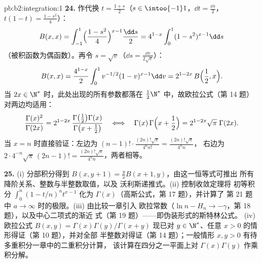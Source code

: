 \begin{solution}{pb:b2:integration:1}
\textbf{24.} 作代换 $t = \frac{1+s}2$（$s \in
\intoo{-1}1$，$\dd t = \frac{\dd s}2$，$t(1-t) =
\frac{1-s^2}4$）：
\[
B(x,x) = \int_{-1}^{1}\Bigl(\frac{1-s^2}{4}\Bigr)^{x-1}
\frac{\dd s}{2}
= 4^{1-x}\int_0^1 (1-s^2)^{x-1}\dd s
\]
（被积函数为偶函数）。再令 $s = \sqrt v$（$\dd s =
\frac{\dd v}{2\sqrt v}$）：
\[
B(x,x) = \frac{4^{1-x}}{2}\int_0^1
v^{-1/2}(1-v)^{x-1}\dd v
= 2^{1-2x}\,B\Bigl(\frac12, x\Bigr) .
\]
当 $2x \in \N^*$ 时，此处出现的所有参数都落在
$\frac12\N^*$ 中，故欧拉公式（第 14 题）
对两边均适用：
\[
\frac{\Gamma(x)^2}{\Gamma(2x)}
= 2^{1-2x}\,
\frac{\Gamma\bigl(\frac12\bigr)\Gamma(x)}
{\Gamma\bigl(x+\frac12\bigr)}
\quad\Longleftrightarrow\quad
\Gamma(x)\,\Gamma\Bigl(x+\frac12\Bigr)
= 2^{1-2x}\sqrt\pi\;\Gamma(2x) .
\]
当 $x = n$ 时直接验证：左边为 $(n-1)!\cdot
\frac{(2n)!\sqrt\pi}{4^n n!} = \frac{(2n)!\sqrt\pi}{4^n n}$，
右边为 $2\cdot4^{-n}\sqrt\pi\,(2n-1)! =
\frac{(2n)!\sqrt\pi}{4^n n}$，两者相等。

\textbf{25.} (i) 分部积分得到 $B(x,y+1) =
\frac yx B(x+1,y)$，由这一恒等式可推出
所有降阶关系、整数与半整数取值，以及
沃利斯递推式。(ii) 控制收敛定理将
初等积分 $\int_0^n(1-t/n)^n t^{x-1}$ 化为
$\Gamma(x)$（高斯公式，第 17 题），并计算了
第 21 题中 $a \to \infty$ 时的极限。(iii) 由比较一章引入
欧拉常数（$\ln n - H_n \to
-\gamma$，第 18 题），以及中心二项式的渐近
式（第 19 题）——即伪装形式的斯特林公式。
(iv) 欧拉公式 $B(x,y) = \Gamma(x)\Gamma(y)/\Gamma(x+y)$ 现已对
$y \in \N^*$、任意 $x > 0$ 的情形得证（第 10 题），并对全部
半整数对得证（第 14 题）；一般情形
$x, y > 0$ 有待多重积分一章中的二重积分计算，
该计算在四分之一平面上对
$\Gamma(x)\Gamma(y)$ 作乘积分解。
\end{solution}

